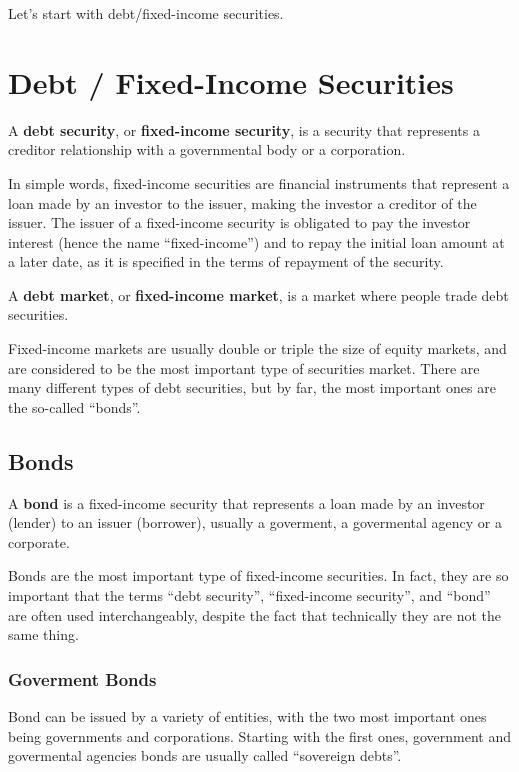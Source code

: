 Let's start with debt/fixed-income securities.

\section{Debt / Fixed-Income Securities}

A \textbf{debt security}, or \textbf{fixed-income security}, is a security that represents a creditor relationship with
a governmental body or a corporation.
\ed

In simple words, fixed-income securities are financial instruments that represent a loan made by an investor to the
issuer, making the investor a creditor of the issuer. The issuer of a fixed-income security is obligated to pay the
investor interest (hence the name ``fixed-income'') and to repay the initial loan amount at a later date, as it is
specified in the terms of repayment of the security.

A \textbf{debt market}, or \textbf{fixed-income market}, is a market where people trade debt securities.
\ed

Fixed-income markets are usually double or triple the size of equity markets, and are considered to be the most
important type of securities market. There are many different types of debt securities, but by far, the most important
ones are the so-called ``bonds''.

\subsection{Bonds}

\bd[Bond]
A \textbf{bond} is a fixed-income security that represents a loan made by an investor (lender) to an issuer (borrower),
usually a goverment, a govermental agency or a corporate.
\ed

Bonds are the most important type of fixed-income securities. In fact, they are so important that the terms ``debt
security'', ``fixed-income security'', and ``bond'' are often used interchangeably, despite the fact that technically
they are not the same thing.

\subsubsection{Goverment Bonds}

Bond can be issued by a variety of entities, with the two most important ones being governments and corporations.
Starting with the first ones, government and govermental agencies bonds are usually called ``sovereign debts''.

